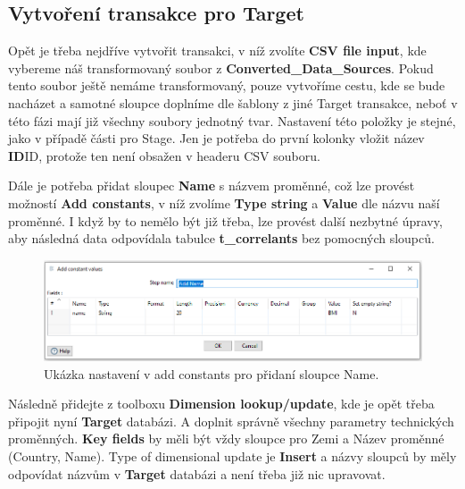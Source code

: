 \documentclass[thesis=M,czech]{FITthesis}[2022/10/08]
\begin{document}
\subsection{Vytvoření transakce pro Target}
Opět je třeba nejdříve vytvořit transakci, v níž zvolíte \textbf{CSV file input}, kde vybereme náš transformovaný soubor z \textbf{Converted\_Data\_Sources}. Pokud tento soubor ještě nemáme transformovaný, pouze vytvoříme cestu, kde se bude nacházet a samotné sloupce doplníme dle šablony z jiné Target transakce, neboť v této fázi mají již všechny soubory jednotný tvar.
Nastavení této položky je stejné, jako v případě části pro Stage. Jen je potřeba do první kolonky vložit název \textbf{ID}ID, protože ten není obsažen v headeru CSV souboru.

Dále je potřeba přidat sloupec \textbf{Name} s názvem proměnné, což lze provést možností \textbf{Add constants}, v níž zvolíme  \textbf{Type string} a \textbf{Value} dle názvu naší proměnné. I když by to nemělo být již třeba, lze provést další nezbytné úpravy, aby následná data odpovídala tabulce \textbf{t\_correlants} bez pomocných sloupců.

\begin{figure}
    \centering
    \includegraphics[width=\textwidth]{DP-obrazky/add_value.png}
    \caption{Ukázka nastavení v add constants pro přidaní sloupce Name.}
    \label{fig:Add_constants}
\end{figure}

Následně přidejte z toolboxu \textbf{Dimension lookup/update}, kde je opět třeba připojit nyní \textbf{Target} databázi. A doplnit správně všechny parametry technických proměnných. \textbf{Key fields} by měli být vždy sloupce pro Zemi a Název proměnné (Country, Name). Type of dimensional update je \textbf{Insert} a názvy sloupců by měly odpovídat názvům v \textbf{Target} databázi a není třeba již nic upravovat.
 
\end{document}
